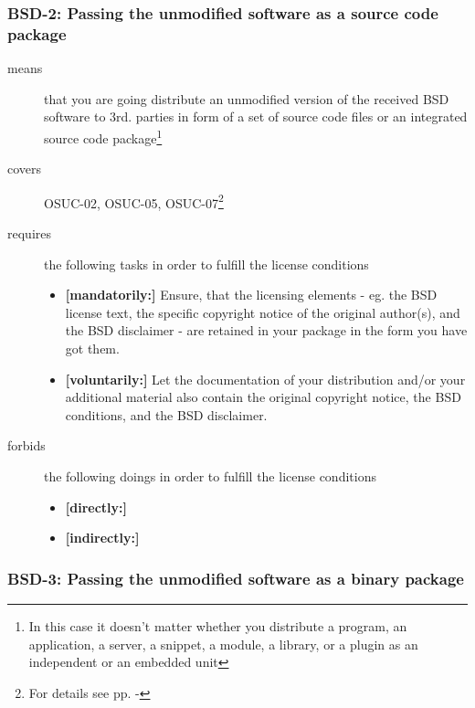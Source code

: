 \subsubsection{BSD-2: Passing the unmodified software as a source code package}
\label{OSUC-02-BSD} \label{OSUC-05-BSD} \label{OSUC-07-BSD} 

\begin{description}
\item[means] that you are going distribute an unmodified version of the received
BSD software to 3rd. parties in form of a set of source code files or an
integrated source code package\footnote{In this case it doesn't matter whether
you  distribute a program, an application, a server, a snippet, a module, a
library, or a plugin as an independent or an embedded unit} 

\item[covers] OSUC-02, OSUC-05, OSUC-07\footnote{For details see pp.
\pageref{OSUC-02-DEF} - \pageref{OSUC-07-DEF}}

\item[requires] the following tasks in order to fulfill the license conditions
\begin{itemize}
  \item \textbf{[mandatorily:]} Ensure, that the licensing elements - eg.
  the BSD license text, the specific copyright notice of the original author(s),
  and the BSD disclaimer - are retained in your package in the form you have got
  them.
  \item \textbf{[voluntarily:]} Let the documentation of your distribution
  and/or your additional material also contain the original copyright notice, the
  BSD conditions, and the BSD disclaimer.
\end{itemize}

\item[forbids] the following doings in order to fulfill the license conditions
\begin{itemize}
  \item \textbf{[directly:]} 
  \item \textbf{[indirectly:]}

\end{itemize}
\end{description}

\subsubsection{BSD-3: Passing the unmodified software as a binary package}

